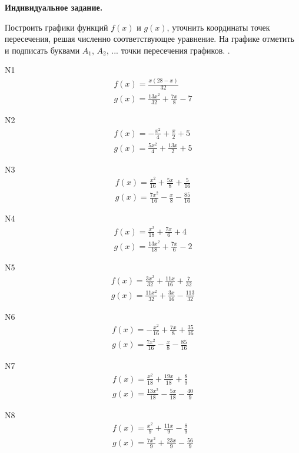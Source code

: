 \documentclass[11pt]{report}
\begin{document}
\pagestyle{empty}

{\bf Индивидуальное задание.}

 
Построить графики функций $f(x)$ и $g(x)$, уточнить координаты точек пересечения, решая численно соответствующее уравнение. 
На  графике отметить и подписать буквами $A_1$, $A_2$, ... точки пересечения графиков.  . 

N1
\begin{align*}
 f(x) = \frac{x \left(28 - x\right)}{32}\\
 g(x) = \frac{13 x^{2}}{32} + \frac{7 x}{8} - 7
\end{align*}

N2
\begin{align*}
 f(x) = - \frac{x^{2}}{4} + \frac{x}{2} + 5\\
 g(x) = \frac{5 x^{2}}{4} + \frac{13 x}{2} + 5
\end{align*}

N3
\begin{align*}
 f(x) = \frac{x^{2}}{16} + \frac{5 x}{8} + \frac{5}{16}\\
 g(x) = \frac{7 x^{2}}{16} - \frac{x}{8} - \frac{85}{16}
\end{align*}

N4
\begin{align*}
 f(x) = \frac{x^{2}}{18} + \frac{7 x}{6} + 4\\
 g(x) = \frac{13 x^{2}}{18} + \frac{7 x}{6} - 2
\end{align*}

N5
\begin{align*}
 f(x) = \frac{3 x^{2}}{32} + \frac{11 x}{16} + \frac{7}{32}\\
 g(x) = \frac{11 x^{2}}{32} + \frac{3 x}{16} - \frac{113}{32}
\end{align*}

N6
\begin{align*}
 f(x) = - \frac{x^{2}}{16} + \frac{7 x}{8} + \frac{35}{16}\\
 g(x) = \frac{7 x^{2}}{16} - \frac{x}{8} - \frac{85}{16}
\end{align*}

N7
\begin{align*}
 f(x) = \frac{x^{2}}{18} + \frac{19 x}{18} + \frac{8}{9}\\
 g(x) = \frac{13 x^{2}}{18} - \frac{5 x}{18} - \frac{40}{9}
\end{align*}

N8
\begin{align*}
 f(x) = \frac{x^{2}}{9} + \frac{11 x}{9} - \frac{8}{9}\\
 g(x) = \frac{7 x^{2}}{9} + \frac{23 x}{9} - \frac{56}{9}
\end{align*}
\end{document}
